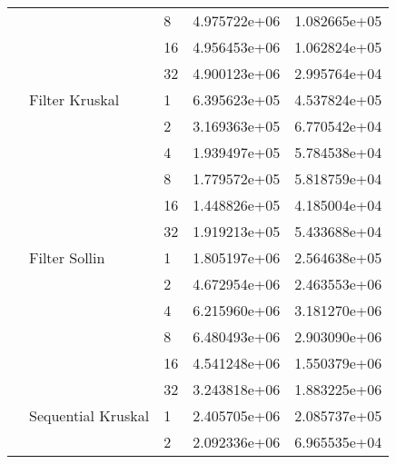 \begin{tabular}{lllrr}
                                                       &                     & 8  &  4.975722e+06 &  1.082665e+05 \\
                                                       &                     & 16 &  4.956453e+06 &  1.062824e+05 \\
                                                       &                     & 32 &  4.900123e+06 &  2.995764e+04 \\
                                                       & Filter Kruskal & 1  &  6.395623e+05 &  4.537824e+05 \\
                                                       &                     & 2  &  3.169363e+05 &  6.770542e+04 \\
                                                       &                     & 4  &  1.939497e+05 &  5.784538e+04 \\
                                                       &                     & 8  &  1.779572e+05 &  5.818759e+04 \\
                                                       &                     & 16 &  1.448826e+05 &  4.185004e+04 \\
                                                       &                     & 32 &  1.919213e+05 &  5.433688e+04 \\
                                                       & Filter Sollin & 1  &  1.805197e+06 &  2.564638e+05 \\
                                                       &                     & 2  &  4.672954e+06 &  2.463553e+06 \\
                                                       &                     & 4  &  6.215960e+06 &  3.181270e+06 \\
                                                       &                     & 8  &  6.480493e+06 &  2.903090e+06 \\
                                                       &                     & 16 &  4.541248e+06 &  1.550379e+06 \\
                                                       &                     & 32 &  3.243818e+06 &  1.883225e+06 \\
                                                       & Sequential Kruskal & 1  &  2.405705e+06 &  2.085737e+05 \\
                                                       &                     & 2  &  2.092336e+06 &  6.965535e+04 \\

\end{tabular}
